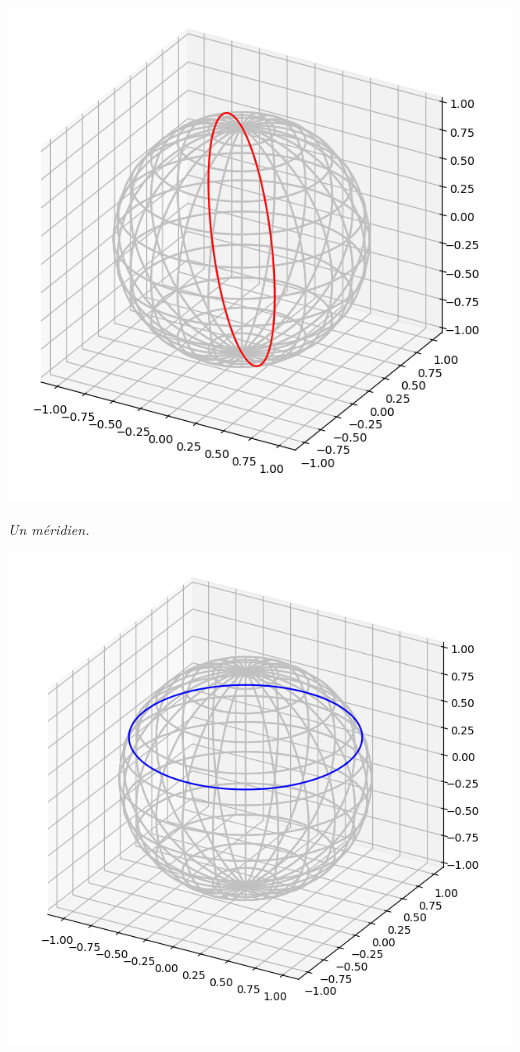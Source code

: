 \documentclass[11pt,class=report,crop=false]{standalone}
\begin{document}
\begin{activite}
\begin{enumerate}
\begin{enumerate}
	
	\begin{center}
		\begin{minipage}{0.4\textwidth}
			\begin{center}
				\includegraphics[scale=\myscale,scale=0.3]{ecran-sphere-1new}
				
				\emph{Un méridien.}
			\end{center}
		\end{minipage}
		\begin{minipage}{0.4\textwidth}
			\begin{center}
				\includegraphics[scale=\myscale,scale=0.3]{ecran-sphere-2new}
				

\end{center}
\end{minipage}
\end{center}
\end{enumerate}
\end{enumerate}
\end{activite}
\end{document}

